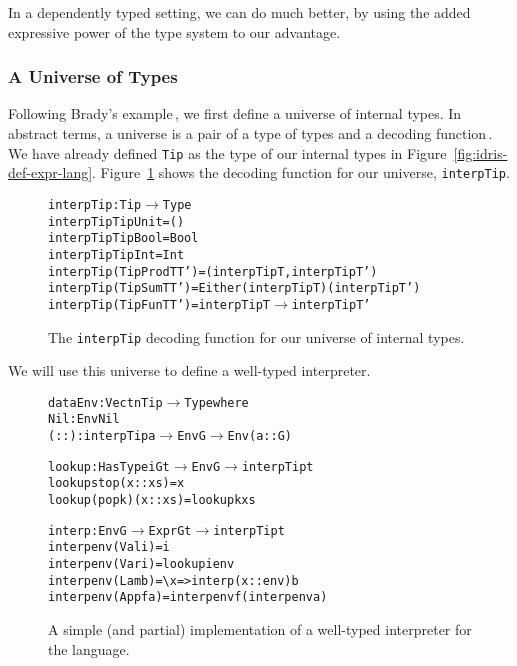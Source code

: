 In a dependently typed setting, we can do much better, by using the added expressive power of the type system to our advantage.

\subsubsection{A Universe of Types}
Following Brady's example\,\cite{Brady:IdrisTutorial}, we first define a universe of internal types. In abstract terms, a universe is a pair of a type of types and a decoding function\,\cite{Oury:2008}. We have already defined \texttt{Tip} as the type of our internal types in Figure~\ref{fig:idris-def-expr-lang}. Figure~\ref{fig:interpTip} shows the decoding function for our universe, \texttt{interpTip}.

\begin{figure}
\begin{alltt}
interpTip : Tip \(\rightarrow\) Type
interpTip TipUnit        = ()
interpTip TipBool        = Bool
interpTip TipInt         = Int
interpTip (TipProd T T') = (interpTip T, interpTip T')
interpTip (TipSum T T')  = Either (interpTip T) (interpTip T')
interpTip (TipFun T T')  = interpTip T \(\rightarrow\) interpTip T'
\end{alltt}
\caption{The \texttt{interpTip} decoding function for our universe of internal types.}
\label{fig:interpTip}
\end{figure}

We will use this universe to define a well-typed interpreter.

\begin{figure}
\begin{alltt}
data Env : Vect n Tip \(\rightarrow\) Type where
  Nil  : Env Nil
  (::) : interpTip a \(\rightarrow\) Env G \(\rightarrow\) Env (a :: G)

lookup : HasType i G t \(\rightarrow\) Env G \(\rightarrow\) interpTip t
lookup stop    (x :: xs) = x
lookup (pop k) (x :: xs) = lookup k xs

interp : Env G \(\rightarrow\) Expr G t \(\rightarrow\) interpTip t
interp env (Val i)   = i
interp env (Var i)   = lookup i env
interp env (Lam b)   = \textbackslash{x} => interp (x :: env) b
interp env (App f a) = interp env f (interp env a)
\end{alltt}
\caption{A simple (and partial) implementation of a well-typed interpreter for the language.}
\label{fig:well-typed-interpreter}
\end{figure}

